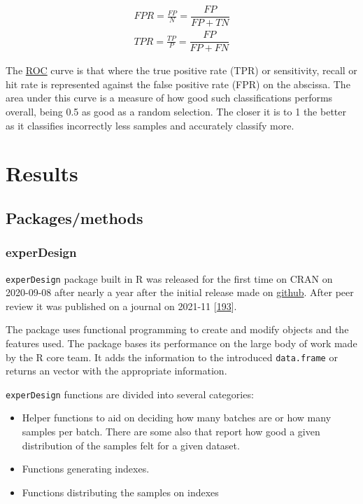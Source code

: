 \documentclass[
  12pt,
  a4paper,
  twoside,
  openright]{book}
\begin{document}
\[
\begin{aligned}
FPR = \frac{FP}{N} = \dfrac{FP}{FP+TN} \\
TPR = \frac{TP}{P} = \dfrac{FP}{FP+FN} 
\end{aligned}
\]

The \protect\hyperlink{acronyms_ROC}{ROC} curve is that where the true positive rate (TPR) or sensitivity, recall or hit rate is represented against the false positive rate (FPR) on the abscissa.
The area under this curve is a measure of how good such classifications performs overall, being 0.5 as good as a random selection.
The closer it is to 1 the better as it classifies incorrectly less samples and accurately classify more.

\hypertarget{results}{%
\chapter{Results}\label{results}}

\hypertarget{packagesmethods}{%
\section{Packages/methods}\label{packagesmethods}}

\hypertarget{experdesign-1}{%
\subsection{experDesign}\label{experdesign-1}}

\texttt{experDesign} package built in R was released for the first time on CRAN on 2020-09-08 after nearly a year after the initial release made on \href{https://github.com/llrs/experDesign}{github}.
After peer review it was published on a journal on 2021-11 {[}\protect\hyperlink{ref-revillasancho2021}{193}{]}.

The package uses functional programming to create and modify objects and the features used.
The package bases its performance on the large body of work made by the R core team.
It adds the information to the introduced \texttt{data.frame} or returns an vector with the appropriate information.

\texttt{experDesign} functions are divided into several categories:

\begin{itemize}
\item
  Helper functions to aid on deciding how many batches are or how many samples per batch.
  There are some also that report how good a given distribution of the samples felt for a given dataset.
\item
  Functions generating indexes.
\item
  Functions distributing the samples on indexes
\end{itemize}
\end{document}
